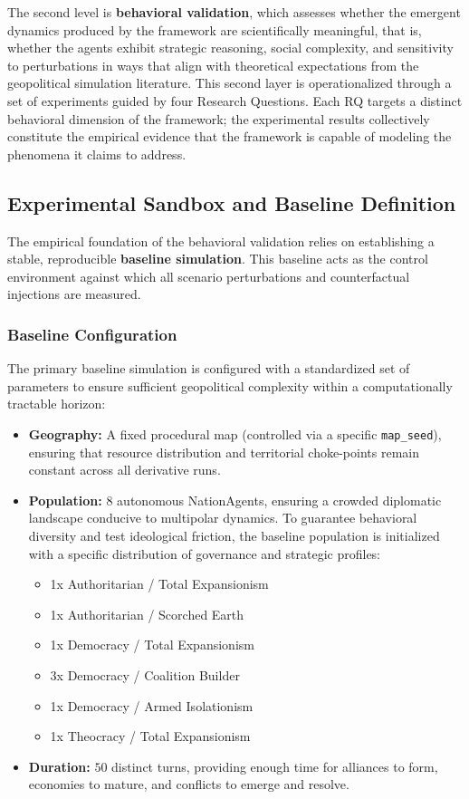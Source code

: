 The second level is \textbf{behavioral validation}, which assesses whether the emergent dynamics produced by the framework are scientifically meaningful, that is, whether the agents exhibit strategic reasoning, social complexity, and sensitivity to perturbations in ways that align with theoretical expectations from the geopolitical simulation literature. This second layer is operationalized through a set of experiments guided by four Research Questions. Each RQ targets a distinct behavioral dimension of the framework; the experimental results collectively constitute the empirical evidence that the framework is capable of modeling the phenomena it claims to address.

\subsection{Experimental Sandbox and Baseline Definition}
\label{sec:baseline_definition}
The empirical foundation of the behavioral validation relies on establishing a stable, reproducible \textbf{baseline simulation}. This baseline acts as the control environment against which all scenario perturbations and counterfactual injections are measured.

\subsubsection*{Baseline Configuration}
The primary baseline simulation is configured with a standardized set of parameters to ensure sufficient geopolitical complexity within a computationally tractable horizon:
\begin{itemize}
    \item \textbf{Geography:} A fixed procedural map (controlled via a specific \texttt{map\_seed}), ensuring that resource distribution and territorial choke-points remain constant across all derivative runs.
    \item \textbf{Population:} $8$ autonomous NationAgents, ensuring a crowded diplomatic landscape conducive to multipolar dynamics. To guarantee behavioral diversity and test ideological friction, the baseline population is initialized with a specific distribution of governance and strategic profiles:
    \begin{itemize}
        \item 1x Authoritarian / Total Expansionism
        \item 1x Authoritarian / Scorched Earth
        \item 1x Democracy / Total Expansionism
        \item 3x Democracy / Coalition Builder
        \item 1x Democracy / Armed Isolationism
        \item 1x Theocracy / Total Expansionism
    \end{itemize}
    \item \textbf{Duration:} $50$ distinct turns, providing enough time for alliances to form, economies to mature, and conflicts to emerge and resolve.
\end{itemize}

